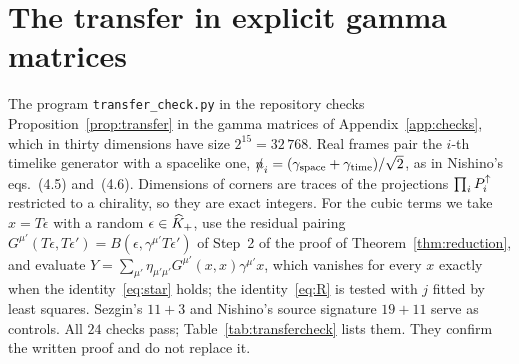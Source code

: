\section{The transfer in explicit gamma matrices}
\label{app:transfer}

The program \texttt{transfer\_check.py} in the repository checks Proposition~\ref{prop:transfer} in the gamma matrices of Appendix~\ref{app:checks}, which in thirty dimensions have size $2^{15}=32\,768$. Real frames pair the $i$-th timelike generator with a spacelike one, $\slashed{n}_i=(\gamma_{\rm space}+\gamma_{\rm time})/\sqrt2$, as in Nishino's eqs.~(4.5) and~(4.6). Dimensions of corners are traces of the projections $\prod_iP^{\uparrow}_i$ restricted to a chirality, so they are exact integers. For the cubic terms we take $x=T\epsilon$ with a random $\epsilon\in\widehat{K}_+$, use the residual pairing $G^{\mu'}(T\epsilon,T\epsilon')=B(\epsilon,\gamma^{\mu'}T\epsilon')$ of Step~2 of the proof of Theorem~\ref{thm:reduction}, and evaluate $Y=\sum_{\mu'}\eta_{\mu'\mu'}G^{\mu'}(x,x)\gamma^{\mu'}x$, which vanishes for every $x$ exactly when the identity~\eqref{eq:star} holds; the identity~\eqref{eq:R} is tested with $j$ fitted by least squares. Sezgin's $11+3$ and Nishino's source signature $19+11$ serve as controls. All $24$ checks pass; Table~\ref{tab:transfercheck} lists them. They confirm the written proof and do not replace it.

